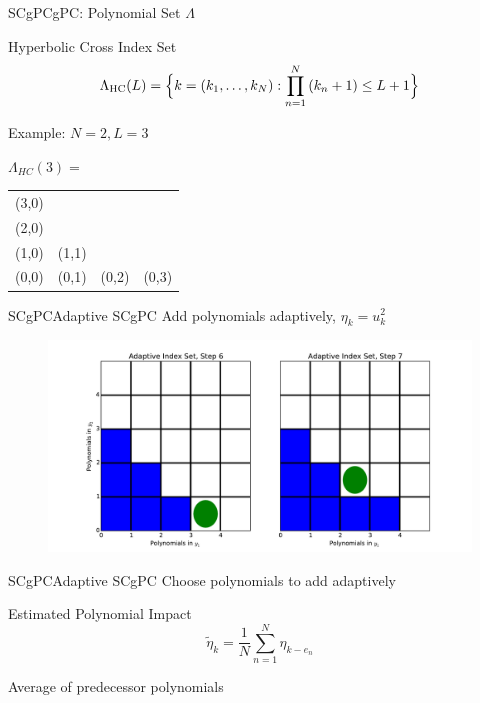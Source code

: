 \documentclass{beamer}
\begin{document}
\begin{frame}{SCgPC}{gPC: Polynomial Set $\Lambda$}%
  \vfill
  \centering
  \begin{exampleblock}{Hyperbolic Cross Index Set}
    \[\Lambda_\text{HC}(L)=\Big\{k=(k_1,\ldots,k_N):\prod_{n=1}^N\qty(k_n+1) \leq L+1 \Big\}\]
  \end{exampleblock}
  \vfill
  Example: $N=2,L=3$
  \vfill
    \begin{table}\centering
      $\Lambda_{HC}(3)=$
      \begin{tabular}{|c c c c|} \hline
        (3,0) &       &       &       \\
        (2,0) &       &       &       \\
        (1,0) & (1,1) &       &       \\
        (0,0) & (0,1) & (0,2) & (0,3) \\ \hline
      \end{tabular}
    \end{table}
  \vfill
\end{frame}

\begin{frame}{SCgPC}{Adaptive SCgPC}%
  Add polynomials adaptively, $\eta_k = u_k^2$
    \begin{figure}[h!]
      \centering
      \includegraphics[width=\linewidth]{asc_step}
    \end{figure}
\end{frame}

\begin{frame}{SCgPC}{Adaptive SCgPC}%
  \vfill
  Choose polynomials to add adaptively
  \vfill
  \begin{block}{Estimated Polynomial Impact}
    \begin{equation*}
        \tilde \eta_k = \frac{1}{N}\sum_{n=1}^N \eta_{k-e_n}
    \end{equation*}
  \end{block}
  \vfill
  Average of predecessor polynomials
  \vfill
\end{frame}
\end{document}
